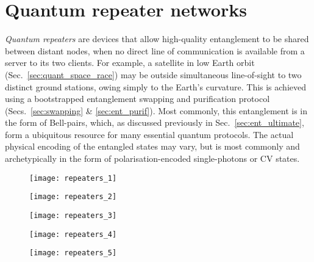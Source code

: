%
%

\section{Quantum repeater networks} \label{sec:rep_net} 

\textit{Quantum repeaters} are devices that allow high-quality entanglement to be shared between distant nodes, when no direct line of communication is available from a server to its two clients. For example, a satellite in low Earth orbit (Sec.~\ref{sec:quant_space_race}) may be outside simultaneous line-of-sight to two distinct ground stations, owing simply to the Earth's curvature. This is achieved using a bootstrapped entanglement swapping and purification protocol (Secs.~\ref{sec:swapping} \& \ref{sec:ent_purif}). Most commonly, this entanglement is in the form of Bell-pairs, which, as discussed previously in Sec.~\ref{sec:ent_ultimate}, form a ubiquitous resource for many essential quantum protocols. The actual physical encoding of the entangled states may vary, but is most commonly and archetypically in the form of polarisation-encoded single-photons or CV states.




\begin{figure}[!htb]
\texttt{[image: repeaters\_1]}
\caption{} \label{fig:repeaters_1}	
\end{figure}

\begin{figure}[!htb]
\texttt{[image: repeaters\_2]}
\caption{} \label{fig:repeaters_2}	
\end{figure}

\begin{figure}[!htb]
\texttt{[image: repeaters\_3]}
\caption{} \label{fig:repeaters_3}	
\end{figure}

\begin{figure}[!htb]
\texttt{[image: repeaters\_4]}
\caption{} \label{fig:repeaters_4}	
\end{figure}

\begin{figure}[!htb]
\texttt{[image: repeaters\_5]}
\caption{} \label{fig:repeaters_5}
\end{figure}

